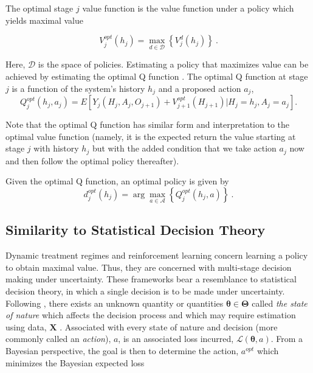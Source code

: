 \noindent The optimal stage $ j  $ value function is the value function under a policy which yields maximal value

\begin{equation}
	V^{opt}_j(h_j) = \max_{d \in \mathcal{D}} \left\{ V^d_j(h_j) \right\} \>.
\end{equation}

\noindent  Here, $\mathcal{D}$ is the space of policies.  Estimating a policy that maximizes value can be achieved by estimating the optimal Q function \cite{chakraborty2013statistical}.  The optimal Q function at stage $ j $ is a function of the system’s history $ h_j $ and a proposed action $ a_j $,
\begin{equation}
	Q_j^{opt}(h_j, a_j) = E \left[ 
	Y_j(H_j, A_j, O_{j+1}) + V^{opt}_{j+1}(H_{j+1}) \lvert H_j = h_j, A_j = a_j
	\right].
\end{equation}

\noindent Note that the optimal Q function has similar form and interpretation to the optimal value function (namely, it is the expected return \textemdash the value \textemdash starting at stage $ j $ with history $h_j$ but with the added condition that we take action $ a_j $ now and then follow the optimal policy thereafter). 

Given the optimal Q function, an optimal policy is given by 
\begin{equation}
	d_j^{opt}(h_j) = \arg\max_{a\in \mathcal{A}} \left\{Q_j^{opt}(h_j,a)\right\} \>.
\end{equation}


\subsection{Similarity to Statistical Decision Theory}

Dynamic treatment regimes and reinforcement learning concern learning a policy to obtain maximal value.  Thus, they are concerned with multi-stage decision making under uncertainty.  These frameworks bear a resemblance to statistical decision theory, in which a single decision is to be made under uncertainty. Following \cite{berger2013statistical}, there exists an unknown quantity or quantities $\boldsymbol{\theta} \in \boldsymbol{\Theta}$ called \textit{the state of nature} which affects the decision process and  which may require estimation using data, $\mathbf{X}$ .  Associated with every state of nature and decision (more commonly called an \textit{action}), $a$, is an associated loss incurred, $\mathcal{L}(\boldsymbol{\theta}, a)$.  From a Bayesian perspective, the goal is then to determine the action, $a^{opt}$ which minimizes the Bayesian expected loss 


